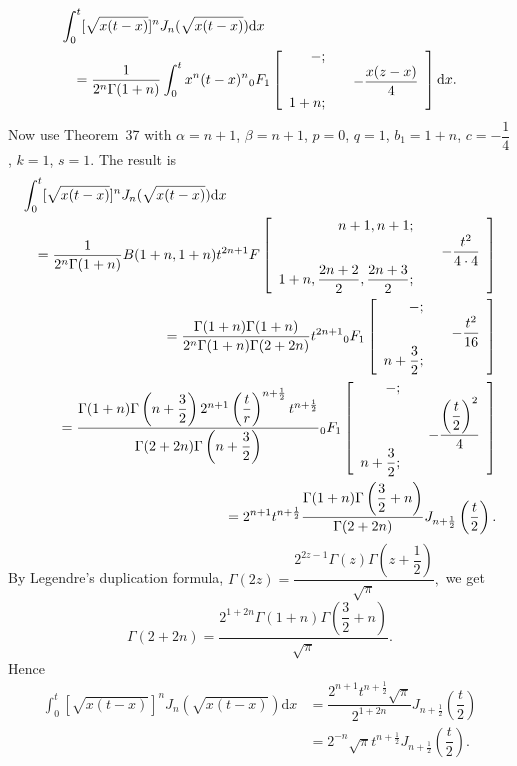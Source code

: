 \begin{solution}
\begin{eqnarray*}
\lefteqn{\displaystyle\int_0^t [\sqrt{x(t-x)} ]^n J_n(\sqrt{x(t-x)})\mathrm{d}x} \\
& & = \dfrac{1}{2^n \Gamma(1+n)} \displaystyle\int_0^t x^n(t-x)^n {}_0F_1 \left[ \begin{array}{rlr}
-; & & \\
& & -\dfrac{x(z-x)}{4} \\
1+n;
\end{array} \right] \mathrm{d}x.
\end{eqnarray*}
Now use Theorem~37 with $\alpha = n+1$, $\beta = n+1$, $p=0$, $q=1$, $b_1=1+n$, $c=-\dfrac{1}{4}$, $k=1$, $s=1.$ The result is
\begin{eqnarray*}
\lefteqn{\displaystyle\int_0^t [\sqrt{x(t-x)}]^n J_n(\sqrt{x(t-x)})\mathrm{d}x} \\
& &= \dfrac{1}{2^n \Gamma(1+n)} B(1+n,1+n)t^{2n+1} F \left[ \begin{array}{rlr} 
n+1,n+1; & & \\
& & -\dfrac{t^2}{4 \cdot 4} \\
1+n, \dfrac{2n+2}{2}, \dfrac{2n+3}{2}; & & 
\end{array} \right] \\
& &= \dfrac{\Gamma(1+n) \Gamma(1+n)}{2^n \Gamma(1+n) \Gamma(2+2n)} t^{2n+1} {}_0F_1 \left[ \begin{array}{rlr}
-; & & \\
& & -\dfrac{t^2}{16} \\
n+ \dfrac{3}{2}; & & 
\end{array} \right] \\
& &= \dfrac{\Gamma(1+n) \Gamma \left( n + \dfrac{3}{2} \right) 2^{n+1} \left( \dfrac{t}{r} \right)^{n + \frac{1}{2}} t^{n + \frac{1}{2}}}{\Gamma(2+2n) \Gamma \left( n + \dfrac{3}{2} \right)} {}_0 F_1 \left[ \begin{array}{rlr}
- ; & & \\
& & - \dfrac{\left( \dfrac{t}{2} \right)^2}{4} \\
n + \dfrac{3}{2}; & & 
\end{array} \right] \\
& &= 2^{n+1} t^{n + \frac{1}{2} } \dfrac{\Gamma(1+n) \Gamma \left( \dfrac{3}{2} + n \right)}{\Gamma(2+2n)} J_{n + \frac{1}{2}} \left( \dfrac{t}{2} \right).
\end{eqnarray*}
By Legendre's duplication formula, $\Gamma(2z) = \dfrac{2^{2z-1} \Gamma(z) \Gamma \left( z + \dfrac{1}{2} \right)}{\sqrt{\pi}},$ we get
$$\Gamma(2 + 2n) = \dfrac{2^{1+2n} \Gamma(1+n)\Gamma \left( \dfrac{3}{2} + n \right)}{\sqrt{\pi}}.$$
Hence
$$\begin{array}{ll}
\displaystyle\int_0^t [\sqrt{x(t-x)}]^n J_n(\sqrt{x(t-x)}) \mathrm{d}x &= \dfrac{2^{n+1} t^{n + \frac{1}{2}} \sqrt{\pi}}{2^{1+2n}} J_{n + \frac{1}{2}} \left( \dfrac{t}{2} \right) \\
&= 2^{-n} \sqrt{\pi} t^{n + \frac{1}{2}} J_{n + \frac{1}{2}} \left( \dfrac{t}{2} \right).
\end{array}$$
\end{solution}
